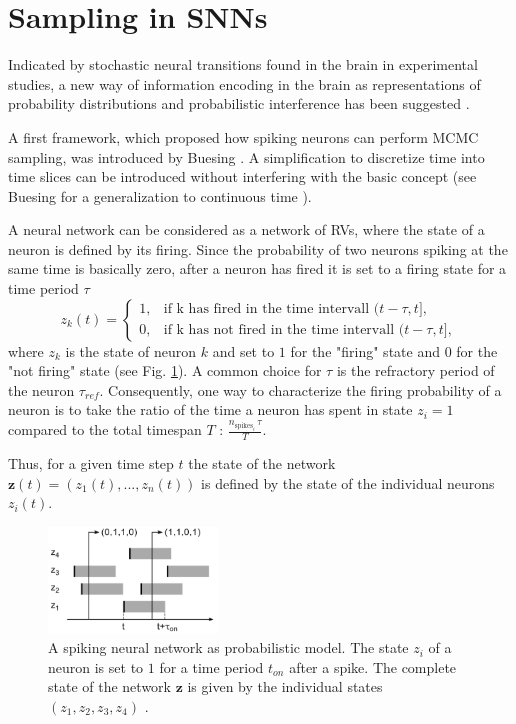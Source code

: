 \section{Sampling in SNNs} \label{c:snnsampling}

Indicated by stochastic neural transitions found in the brain in experimental studies, a new way of information encoding in the brain as representations of probability distributions and probabilistic interference has been suggested \cite{griffiths2008bayesian, lee2003hierarchical, yang2007probabilistic}.


A first framework, which proposed how spiking neurons can perform MCMC sampling, was introduced by Buesing \cite{Buesing2011}.
A simplification to discretize time into time slices can be introduced without interfering with the basic concept (see Buesing for a generalization to continuous time \cite{Buesing2011}).

A neural network can be considered as a network of RVs, where the state of a neuron is defined by its firing. 
Since the probability of two neurons spiking at the same time is basically zero, after a neuron has fired it is set to a firing state for a time period $\tau$
\[
z_k(t) = 
\begin{cases}
1, &  \text{if k has fired in the time intervall } (t - \tau , t ], \\
0, &  \text{if k has not fired in the time intervall } (t - \tau , t ],
\end{cases}
\] 
where $z_k$ is the state of neuron $k$ and set to $1$ for the "firing" state and $0$ for the "not firing" state (see Fig. \ref{fig:snnsamp1}). 
A common choice for $\tau$ is the refractory period of the neuron $\tau_{ref}$.
Consequently, one way to characterize the firing probability of a neuron is to take the ratio of the time a neuron has spent in state $z_i=1$ compared to the total timespan $T$ : $\frac{n_{\text{spikes}_i} \, \tau}{ T }$.

Thus, for a given time step $t$ the state of the network $\textbf{z}(t) = (z_1(t), ... ,z_n(t))$ is defined by the state of the individual neurons $z_i(t)$. 


\begin{figure}
	\centering
    	\includegraphics[width=0.4\textwidth]{imgs/snn_sample1.png} 
    \caption[A spiking neural network as probabilistic model.]{A spiking neural network as probabilistic model. The state $z_i$ of a neuron is set to $1$ for a time period $t_{on}$ after a spike. The complete state of the network $\textbf{z}$ is given by the individual states $(z_1, z_2, z_3, z_4)$  \cite{Petrovici2016}.}
	\label{fig:snnsamp1}
\end{figure}

